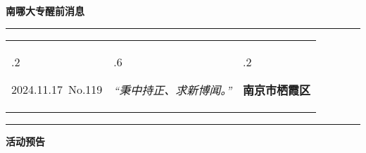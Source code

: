 \documentclass[letterpaper, 12pt]{article}
\begin{document}
\begin{center}
    \Huge\textbf{南哪大专醒前消息}
\end{center}
\vspace{4mm}
\hrule
\renewcommand\tabularxcolumn[1]{m{#1}}
\begin{tabularx}{\textwidth}{>{\hsize.2\hsize}X>{\hsize.6\hsize}X>{\hsize.2\hsize}X}
    \begin{flushleft}
        2024.11.17\, No.119
    \end{flushleft}
    &
    \begin{center}
        \textit{“秉中持正、求新博闻。”}
    \end{center}
    &
    \begin{flushright}
        \textbf{南京市栖霞区}
    \end{flushright}
\end{tabularx}
\vspace{-3.5mm}
\hrule
\vspace{4mm}
\centerline{\huge\textbf{活动预告}}
\end{document}
